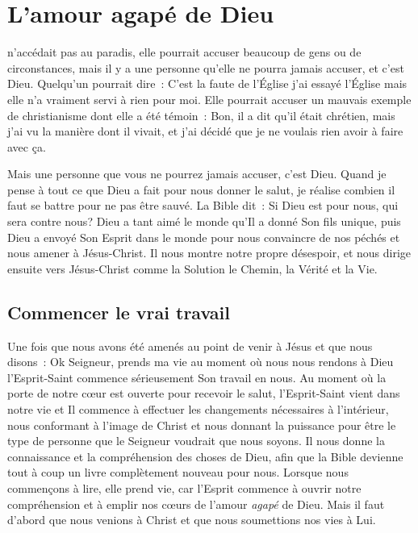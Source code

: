 \chapter{L'amour agapé de Dieu}

 n'accédait pas au paradis,
 elle pourrait accuser beaucoup de gens
 ou de circonstances, mais il y a une personne
 qu'elle ne pourra jamais accuser, et c'est Dieu.
 Quelqu'un pourrait dire~:
 \og C'est la faute de l'Église \ocadr j'ai essayé l'Église mais
 elle n'a vraiment servi à rien pour moi. \fg{}
 Elle pourrait accuser un mauvais exemple de christianisme
 dont elle a été témoin~:
 \og Bon, il a dit qu'il était chrétien, mais j'ai vu la manière
 dont il vivait, et j'ai décidé que je ne voulais rien avoir à faire
 avec ça. \fg{}

Mais une personne que vous ne pourrez jamais accuser, c'est Dieu.
 Quand je pense à tout ce que Dieu a fait pour nous donner le salut,
 je réalise combien il faut se battre pour ne pas être sauvé.
 La Bible dit~:
 \og Si Dieu est pour nous, qui sera contre nous? \fg{}
 Dieu a tant aimé le monde qu'Il a donné Son fils unique,
 puis Dieu a envoyé Son Esprit dans le monde pour nous convaincre
 de nos péchés et nous amener à Jésus-Christ.
 Il nous montre notre propre désespoir, et nous dirige ensuite
 vers Jésus-Christ comme la Solution \ocadr le Chemin, la Vérité et la Vie.

\section*{Commencer le vrai travail}

Une fois que nous avons été amenés au point de venir à Jésus
 et que nous disons~:
 \og Ok Seigneur, prends ma vie \fg{}
 \ocadr au moment où nous nous rendons à Dieu \fcadr
 l'Esprit-Saint commence sérieusement Son travail en nous.
 Au moment où la porte de notre cœur est ouverte pour recevoir le salut,
 l'Esprit-Saint vient dans notre vie et Il commence à effectuer
 les changements nécessaires à l'intérieur, nous conformant
 à l'image de Christ et nous donnant la puissance pour être
 le type de personne que le Seigneur voudrait que nous soyons.
 Il nous donne la connaissance et la compréhension des choses de Dieu,
 afin que la Bible devienne tout à coup un livre complètement
 nouveau pour nous. Lorsque nous commençons à lire,
 elle prend vie, car l'Esprit commence à ouvrir notre compréhension
 et à emplir nos cœurs de l'amour \emph{agapé} de Dieu.
 Mais il faut d'abord que nous venions à Christ
 et que nous soumettions nos vies à Lui.

